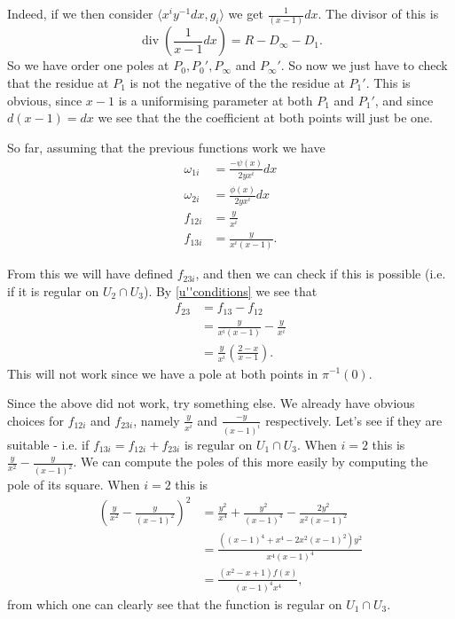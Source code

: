 \documentclass[draft, 11pt]{article} %
\theoremstyle{plain}
\theoremstyle{remark}
\DeclareMathOperator{\di}{div}
\begin{document}
Indeed, if we then consider $\langle x^iy^{-1}dx, g_i \rangle$ we get $\frac{1}{(x-1)}dx$.
The divisor of this is
\[
\di \left( \frac{1}{x-1}dx \right) = R - D_\infty - D_1.
\]
So we have order one poles at $P_0, P_0', P_\infty$ and $P_\infty'$.
So now we just have to check that the residue at $P_1$ is not the negative of the the residue at $P_1'$.
This is obvious, since $x-1$ is a uniformising parameter at both $P_1$ and $P_1'$, and since $d(x-1) = dx$ we see that the the coefficient at both points will just be one.

So far, assuming that the previous functions work we have
\begin{align*}
\omega_{1i} & = \frac{-\psi(x)}{2yx^i} dx \\
\omega_{2i} & = \frac{\phi(x)}{2yx^i} dx \\
f_{12i} & = \frac{y}{x^i} \\
f_{13i} & = \frac{y}{x^i(x-1)}.
\end{align*}

From this we will have defined $f_{23i}$, and then we can check if this is possible (i.e. if it is regular on $U_2 \cap U_3$).
By \eqref{u''conditions} we see that
\begin{align*}
f_{23} & = f_{13} - f_{12} \\
& = \frac{y}{x^i(x-1)} - \frac{y}{x^i} \\
& = \frac{y}{x^i} \left( \frac{2-x}{x-1} \right).
\end{align*}
This will not work since we have a pole at both points in $ \pi^{-1}(0)$.


Since the above did not work, try something else.
We already have obvious choices for $f_{12i}$ and $f_{23i}$, namely $\frac{y}{x^i}$ and $\frac{-y}{(x-1)^i}$ respectively.
Let's see if they are suitable - i.e. if $f_{13i}=f_{12i} + f_{23i}$ is regular on $U_1 \cap U_3$.
When $i=2$ this is $\frac{y}{x^2} - \frac{y}{(x-1)^2}$.
We can compute the poles of this more easily by computing the pole of its square.
When $i=2$ this is
\begin{align*}
\left( \frac{y}{x^2} - \frac{y}{(x-1)^2} \right)^2 & = \frac{y^2}{x^4} + \frac{y^2}{(x-1)^4} - \frac{2y^2}{x^2(x-1)^2} \\
& = \frac{((x-1)^4 + x^4 - 2x^2(x-1)^2)y^2}{x^4(x-1)^4} \\
& = \frac{(x^2-x+1)f(x)}{(x-1)^4x^4},
\end{align*}
from which one can clearly see that the function is regular on $U_1 \cap U_3$.
\end{document}

